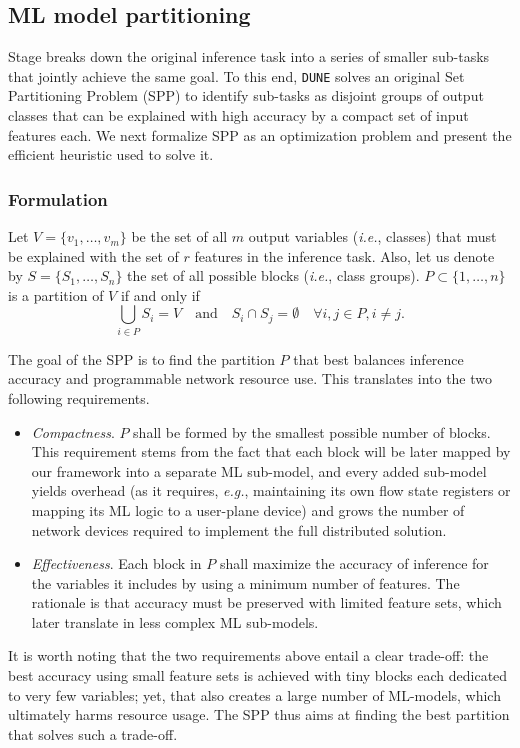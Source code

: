 \documentclass[journal]{IEEEtran}
\theoremstyle{plain} %
\newcommand{\eg}{\textit{e.g.},\xspace}
\newcommand{\ie}{\textit{i.e.},\xspace}
\newcommand*\numO[1]{\raisebox{.5pt}{\textcircled{\raisebox{-.9pt} {#1}}}}
\newcommand{\name}{\texttt{\fontsize{9}{11}\selectfont DUNE}\xspace}
\begin{document}
\subsection{ML model partitioning}
\label{sub:partitioning}

Stage \numO{3} breaks down the original inference task into a series of smaller sub-tasks that jointly achieve the same goal. To this end, \name solves an original Set Partitioning Problem (SPP) to identify sub-tasks as disjoint groups of output classes that can be explained with high accuracy by a compact set of input features each. We next formalize SPP as an optimization problem and present the efficient heuristic used to solve it.

\vspace*{4pt}
\subsubsection{Formulation}
Let $V=\{v_1,\dots,v_m\}$ be the set of all $m$ output variables (\ie classes) that must be explained with the set of $r$ features in the inference task. Also, let us denote by $S=\{S_1,\dots,S_n\}$ the set of all possible blocks (\ie class groups). $P \subset \{1,\dots,n\}$ is a partition of $V$ if and only if
\begin{equation}
    \bigcup_{i\in P}S_{i}= V \quad \text{and} \quad
    S_i \cap S_j = \emptyset \quad \forall i,j \in P, i\neq j.
    \label{eq:opt-constraints}
\end{equation}

The goal of the SPP is to find the partition $P$ that best balances inference accuracy and programmable network resource use. This translates into the two following requirements.
\begin{itemize}
    \item[($i$)] \textit{Compactness}. $P$ shall be formed by the smallest possible number of blocks. This requirement stems from the fact that each block will be later mapped by our framework into a separate ML sub-model, and every added sub-model yields overhead (as it requires, \eg maintaining its own flow state registers or mapping its ML logic to a user-plane device) and grows the number of network devices required to implement the full distributed solution.
    \item[($ii$)] \textit{Effectiveness}. Each block in $P$ shall maximize the accuracy of inference for the variables it includes by using a minimum number of features. The rationale is that accuracy must be preserved with limited feature sets, which later translate in less complex ML sub-models.
\end{itemize}
It is worth noting that the two requirements above entail a clear trade-off: the best accuracy using small feature sets is achieved with tiny blocks each dedicated to very few variables; yet, that also creates a large number of ML-models, which ultimately harms resource usage. The SPP thus aims at finding the best partition that solves such a trade-off.
\end{document}
